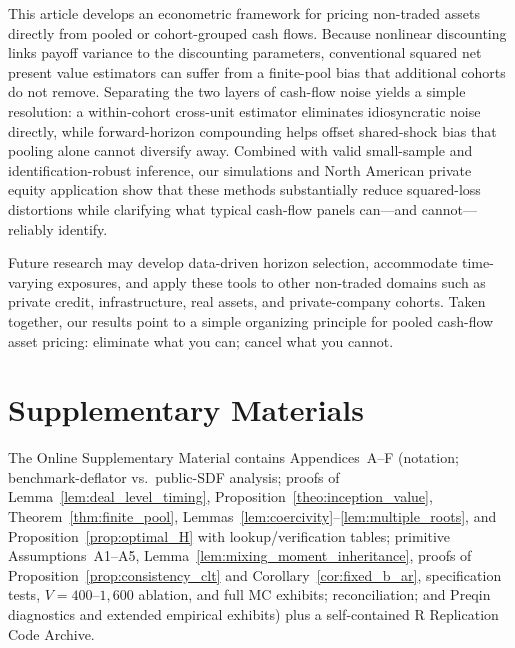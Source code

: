 \documentclass[12pt]{article}
\begin{document}
This article develops an econometric framework for pricing non-traded assets directly from pooled or cohort-grouped cash flows.
Because nonlinear discounting links payoff variance to the discounting parameters, conventional squared net present value estimators can suffer from a finite-pool bias that additional cohorts do not remove.
Separating the two layers of cash-flow noise yields a simple resolution: a within-cohort cross-unit estimator eliminates idiosyncratic noise directly, while forward-horizon compounding helps offset shared-shock bias that pooling alone cannot diversify away.
Combined with valid small-sample and identification-robust inference, our simulations and North American private equity application show that these methods substantially reduce squared-loss distortions while clarifying what typical cash-flow panels can---and cannot---reliably identify.

Future research may develop data-driven horizon selection, accommodate time-varying exposures, and apply these tools to other non-traded domains such as private credit, infrastructure, real assets, and private-company cohorts.
Taken together, our results point to a simple organizing principle for pooled cash-flow asset pricing: eliminate what you can; cancel what you cannot.

\singlespacing
\section*{Supplementary Materials}

\noindent The Online Supplementary Material contains Appendices~A--F (notation; benchmark-deflator vs.\ public-SDF analysis; proofs of Lemma~\ref{lem:deal_level_timing}, Proposition~\ref{theo:inception_value}, Theorem~\ref{thm:finite_pool}, Lemmas~\ref{lem:coercivity}--\ref{lem:multiple_roots}, and Proposition~\ref{prop:optimal_H} with lookup/verification tables; primitive Assumptions~A1--A5, Lemma~\ref{lem:mixing_moment_inheritance}, proofs of Proposition~\ref{prop:consistency_clt} and Corollary~\ref{cor:fixed_b_ar}, specification tests, $V=400\text{--}1{,}600$ ablation, and full MC exhibits; \citet{DLP12} reconciliation; and Preqin diagnostics and extended empirical exhibits) plus a self-contained R Replication Code Archive.
\end{document}
